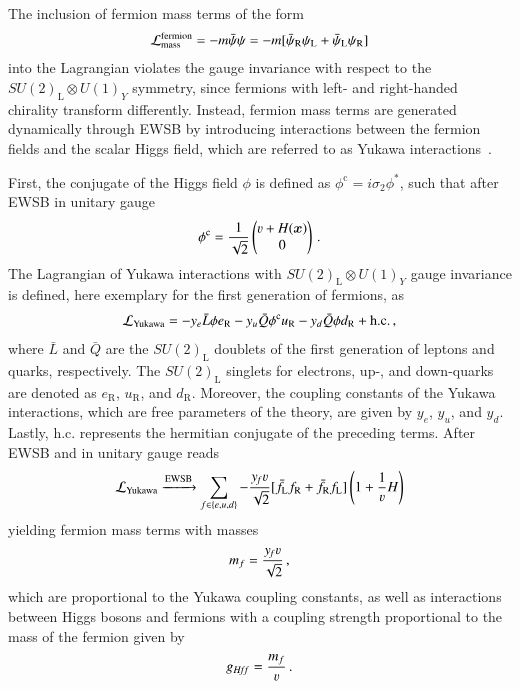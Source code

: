 The inclusion of fermion mass terms of the form
\begin{align*}
  \mathcal{L}_{\text{mass}}^{\text{fermion}} = - m \bar{\psi} \psi = - m [ \bar{\psi}_\text{R} \psi_\text{L} + \bar{\psi}_\text{L} \psi_\text{R} ]
\end{align*}
into the Lagrangian violates the gauge invariance with respect to the
$SU(2)_{\text{L}} \otimes U(1)_Y$ symmetry, since fermions with left- and
right-handed chirality transform differently. Instead, fermion mass terms are
generated dynamically through EWSB by introducing interactions between the
fermion fields and the scalar Higgs field, which are referred to as Yukawa
interactions~\cite{Yukawa:1935xg}.

First, the conjugate of the Higgs field $\phi$ is defined as
$\phi^{\text{c}} = i \sigma_2 \phi^*$, such that after EWSB in unitary gauge
\begin{align*}
  \phi^{\text{c}} = \frac{1}{\sqrt{2}}
  \begin{pmatrix}
    \varv + H(\myvec{x}) \\
    0
  \end{pmatrix} \,\text{.}
\end{align*}
The Lagrangian of Yukawa interactions with $SU(2)_{\text{L}} \otimes U(1)_Y$
gauge invariance is defined, here exemplary for the first generation of
fermions, as
\begin{align}
  \mathcal{L}_{\text{Yukawa}} =
  - y_e \bar{L} \phi e_{\text{R}}
  - y_u \bar{Q} \phi^{\text{c}} u_{\text{R}}
  - y_d \bar{Q} \phi d_{\text{R}}
  + \text{h.c.} \,\text{,}
  \label{eq:lagrangian_yukawa}
\end{align}
where $\bar{L}$ and $\bar{Q}$ are the $SU(2)_{\text{L}}$ doublets of the first
generation of leptons and quarks, respectively. The $SU(2)_{\text{L}}$ singlets
for electrons, up-, and down-quarks are denoted as $e_{\text{R}}$,
$u_{\text{R}}$, and $d_{\text{R}}$. Moreover, the coupling constants of the
Yukawa interactions, which are free parameters of the theory, are given by
$y_e$, $y_u$, and $y_d$. Lastly, $\text{h.c.}$ represents the hermitian
conjugate of the preceding terms. After EWSB and in unitary gauge
 reads
\begin{align*}
  \lagrange_{\text{Yukawa}} \xrightarrow{\text{EWSB}} \sum_{f \in \{e, u, d\}} -\frac{y_{\hspace{-0.1em}f} \varv}{\sqrt{2}} [ \bar{f}_{\text{L}} f_{\text{R}} + \bar{f}_{\text{R}} f_{\text{L}} ] \left( 1 + \frac{1}{\varv} H \right)
\end{align*}
yielding fermion mass terms with masses
\begin{align*}
  m_{f} = \frac{y_{\hspace{-0.1em}f} \varv}{\sqrt{2}} \,\text{,}
\end{align*}
which are proportional to the Yukawa coupling constants, as well as interactions
between Higgs bosons and fermions with a coupling strength proportional to the
mass of the fermion given by
\begin{align*}
  g_{H\!f\!f} = \frac{m_f}{\varv} \,\text{.}
\end{align*}

